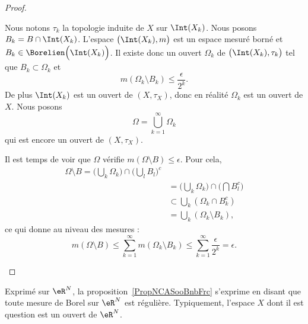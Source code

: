 \begin{proof}
\begin{subproof}
    Nous notons \( \tau_k\) la topologie induite de \( X\) sur \( \Int(X_k)\). Nous posons \( B_k=B\cap\Int(X_k)\). L'espace \( \big( \Int(X_k),m \big)\) est un espace mesuré borné et \( B_k\in \Borelien\Big( \Int(X_k) \Big)\). Il existe donc un ouvert \( \Omega_k\) de \( \big( \Int(X_k),\tau_k \big)\) tel que \( B_k\subset \Omega_k\) et
    \begin{equation}
        m(\Omega_k\setminus B_k)\leq \frac{ \epsilon }{ 2^k }.
    \end{equation}
    De plus \( \Int(X_k)\) est un ouvert de \( (X,\tau_X)\), donc en réalité \( \Omega_k\) est un ouvert de \( X\). Nous posons
    \begin{equation}
        \Omega=\bigcup_{k=1}^{\infty}\Omega_k
    \end{equation}
    qui est encore un ouvert de \( (X,\tau_X)\).

    Il est temps de voir que \( \Omega\) vérifie \( m(\Omega\setminus B)\leq \epsilon\). Pour cela,
    \begin{subequations}
        \begin{align}
            \Omega\setminus B=\big( \bigcup_k\Omega_k \big)\cap\big( \bigcup_lB_l \big)^c\\
            &=\big( \bigcup_k\Omega_k \big)\cap\big( \bigcap B_l^c \big)\\
            &\subset\bigcup_k(\Omega_k\cap B_k^c)\\
            &=\bigcup_k(\Omega_k\setminus B_k),
        \end{align}
    \end{subequations}
    ce qui donne au niveau des mesures :
    \begin{equation}
        m(\Omega\setminus B)\leq\sum_{k=1}^{\infty}m(\Omega_k\setminus B_k)\leq\sum_{k=1}^{\infty}\frac{ \epsilon }{ 2^k }=\epsilon.
    \end{equation}
    \end{subproof}
\end{proof}

\begin{remark}      \label{RemooOAGCooRHpjxd}
    Exprimé sur \( \eR^N\), la proposition~\ref{PropNCASooBnbFrc} s'exprime en disant que toute mesure de Borel sur \( \eR^N\) est régulière. Typiquement, l'espace \( X\) dont il est question est un ouvert de \( \eR^N\).
\end{remark}


